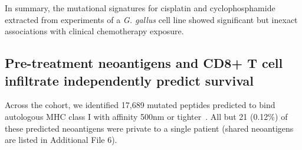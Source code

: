\documentclass{bmcart}
\begin{document}
In summary, the mutational signatures for cisplatin and cyclophosphamide extracted from experiments of a \textit{G. gallus} cell line showed significant but inexact associations with clinical chemotherapy exposure. 

\subsection*{Pre-treatment neoantigens and CD8+ T cell infiltrate independently predict survival}

Across the cohort, we identified 17,689 mutated peptides predicted to bind autologous MHC class I with affinity 500nm or tighter~\cite{Sette1994}. All but 21 (0.12\%) of these predicted neoantigens were private to a single patient (shared neoantigens are listed in Additional File 6).




\end{document}
